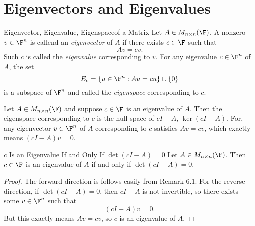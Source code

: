 \documentclass[linearalgebra]{subfiles}
\begin{document}

    \section{Eigenvectors and Eigenvalues}
    
    \begin{definition}{Eigenvector, Eigenvalue, Eigenspace}{of a Matrix}
        Let $A\in M_{n\times n}(\F)$. A nonzero $v\in \F^n$ is callend an \emph{eigenvector} of $A$ if there exists $c\in \F$ such that
        \begin{equation*}
            Av = c v.
        \end{equation*}
        Such $c$ is called the \emph{eigenvalue} corresponding to $v$. For any eigenvalue $c\in\F^n$ of $A$, the set
        \begin{equation*}
            E_c = \left\lbrace u\in\F^n: Au = c u \right\rbrace \cup \left\lbrace 0 \right\rbrace
        \end{equation*}
        is a subspace of $\F^n$ and called the \emph{eigenspace} corresponding to $c$.
    \end{definition}

    \begin{remark}
        Let $A\in M_{n\times n}(\F)$ and suppose $c\in\F$ is an eigenvalue of $A$. Then the eigenspace corresponding to $c$ is the null space of $cI-A$, $\ker(cI-A)$. For, any eigenvector $v\in\F^n$ of $A$ corresponding to $c$ satisfies $Av = cv$, which exactly means $\left( cI-A \right) v = 0$.
    \end{remark}

    \begin{prop}{$c$ Is an Eigenvalue If and Only If $\det \left( cI-A \right) =0$}
        Let $A\in M_{n\times n}(\F)$. Then $c\in\F$ is an eigenvalue of $A$ if and only if $\det \left( cI-A \right) = 0$.
    \end{prop}
    
    \begin{proof}
        The forward direction is follows easily from Remark 6.1. For the reverse direction, if $\det\left( cI-A \right) = 0$, then $cI-A$ is not invertible, so there exists some $v\in\F^n$ such that
        \begin{equation*}
            \left( cI-A \right) v = 0.
        \end{equation*}
        But this exactly means $Av = c v$, so $c$ is an eigenvalue of $A$.
    \end{proof}
\end{document}

